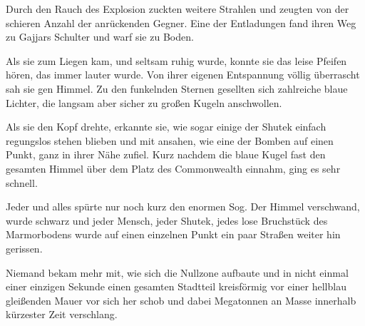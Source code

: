 \par

Durch den Rauch des Explosion zuckten weitere Strahlen und zeugten von der schieren Anzahl der anrückenden Gegner. Eine der Entladungen fand ihren Weg zu Gajjars Schulter und warf sie zu Boden.

\par

Als sie zum Liegen kam, und seltsam ruhig wurde, konnte sie das leise Pfeifen hören, das immer lauter wurde. Von ihrer eigenen Entspannung völlig überrascht sah sie gen Himmel. Zu den funkelnden Sternen gesellten sich zahlreiche blaue Lichter, die langsam aber sicher zu großen Kugeln anschwollen.

\par

Als sie den Kopf drehte, erkannte sie, wie sogar einige der Shutek einfach regungslos stehen blieben und mit ansahen, wie eine der Bomben auf einen Punkt, ganz in ihrer Nähe zufiel. Kurz nachdem die blaue Kugel fast den gesamten Himmel über dem Platz des Commonwealth einnahm, ging es sehr schnell.

\par

Jeder und alles spürte nur noch kurz den enormen Sog. Der Himmel verschwand, wurde schwarz und jeder Mensch, jeder Shutek, jedes lose Bruchstück des Marmorbodens wurde auf einen einzelnen Punkt ein paar Straßen weiter hin gerissen.

\par

Niemand bekam mehr mit, wie sich die Nullzone aufbaute und in nicht einmal einer einzigen Sekunde einen gesamten Stadtteil kreisförmig vor einer hellblau gleißenden Mauer vor sich her schob und dabei Megatonnen an Masse innerhalb kürzester Zeit verschlang.
